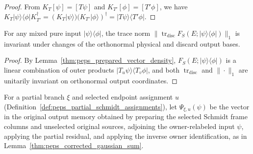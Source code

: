 \begin{proof}\leanok
    From $K_T[\psi]=[T\psi]$ and $K_{T'}[\phi]=[T'\phi]$, we have
    $K_T|\psi\rangle\langle\phi|K_{T'}^\dagger=(K_T|\psi\rangle)(K_{T'}|\phi\rangle)^\dagger
        =|T\psi\rangle\langle T'\phi|$.
\end{proof}

\begin{lemma}
    \label{thm:peps_physical_corrected_basis_invariance}
    \leanok
    For any mixed pure input $|\psi\rangle\langle\phi|$, the trace norm
    $\|\operatorname{tr}_{\mathrm{disc}}F_S(E;|\psi\rangle\langle\phi|)\|_1$ is
    invariant under changes of the orthonormal physical and discard output bases.
\end{lemma}

\begin{proof}\leanok
    By Lemma~\ref{thm:peps_prepared_vector_density}, $F_S(E;|\psi\rangle\langle\phi|)$
    is a linear combination of outer products $|T_u\psi\rangle\langle T_v\phi|$,
    and both $\operatorname{tr}_{\mathrm{disc}}$ and $\|\cdot\|_1$ are unitarily
    invariant on orthonormal output coordinates.
\end{proof}

\begin{definition}
    \label{def:peps_partial_schmidt_output}
    \leanok
    For a partial branch $\xi$ and selected endpoint assignment $u$
    (Definition~\ref{def:peps_partial_schmidt_assignments}), let
    $\Psi_{\xi,u}(\psi)$ be the vector in the original output memory obtained by
    preparing the selected Schmidt frame columns and unselected original sources,
    adjoining the owner-relabeled input $\psi$, applying the partial residual,
    and applying the inverse owner identification, as in
    Lemma~\ref{thm:peps_corrected_gaussian_sum}.
\end{definition}

